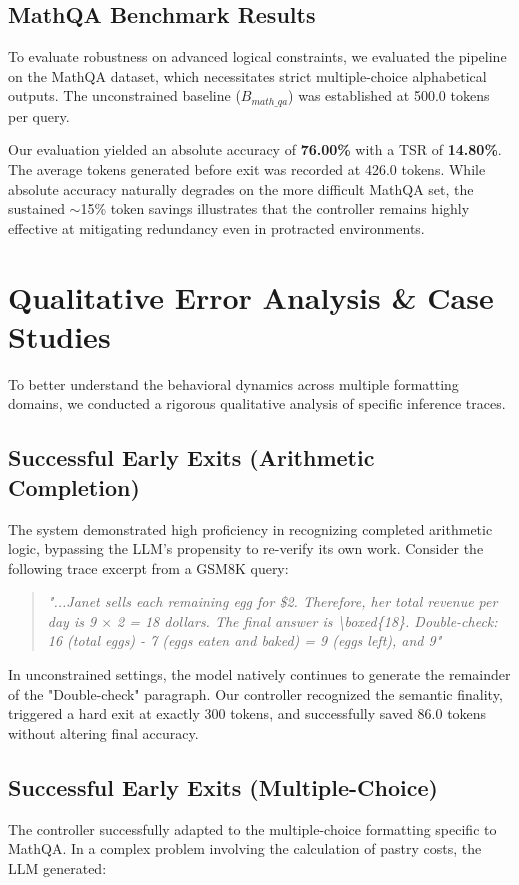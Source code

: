 \documentclass[11pt]{article}
\begin{document}
\subsection{MathQA Benchmark Results}
To evaluate robustness on advanced logical constraints, we evaluated the pipeline on the MathQA dataset, which necessitates strict multiple-choice alphabetical outputs. The unconstrained baseline ($B_{math\_qa}$) was established at 500.0 tokens per query.

Our evaluation yielded an absolute accuracy of \textbf{76.00\%} with a TSR of \textbf{14.80\%}. The average tokens generated before exit was recorded at 426.0 tokens. While absolute accuracy naturally degrades on the more difficult MathQA set, the sustained $\sim$15\% token savings illustrates that the controller remains highly effective at mitigating redundancy even in protracted environments. 

\section{Qualitative Error Analysis \& Case Studies}
To better understand the behavioral dynamics across multiple formatting domains, we conducted a rigorous qualitative analysis of specific inference traces.

\subsection{Successful Early Exits (Arithmetic Completion)}
The system demonstrated high proficiency in recognizing completed arithmetic logic, bypassing the LLM's propensity to re-verify its own work. Consider the following trace excerpt from a GSM8K query:

\begin{quote}
\small
\textit{"...Janet sells each remaining egg for \$2. Therefore, her total revenue per day is 9 $\times$ 2 = 18 dollars. The final answer is \textbackslash boxed\{18\}. Double-check: 16 (total eggs) - 7 (eggs eaten and baked) = 9 (eggs left), and 9"}
\normalsize
\end{quote}

In unconstrained settings, the model natively continues to generate the remainder of the "Double-check" paragraph. Our controller recognized the semantic finality, triggered a hard exit at exactly 300 tokens, and successfully saved 86.0 tokens without altering final accuracy.

\subsection{Successful Early Exits (Multiple-Choice)}
The controller successfully adapted to the multiple-choice formatting specific to MathQA. In a complex problem involving the calculation of pastry costs, the LLM generated:
\end{document}
